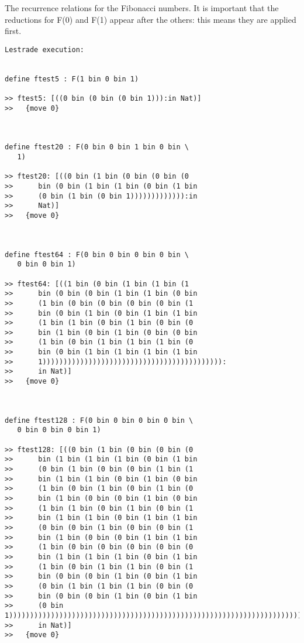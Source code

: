 \documentclass{article}
\begin{document}
The recurrence relations for the Fibonacci numbers.  It is important that the reductions for F(0) and F(1) appear after the others:  this means
they are applied first.

\begin{verbatim}Lestrade execution:


define ftest5 : F(1 bin 0 bin 1)

>> ftest5: [((0 bin (0 bin (0 bin 1))):in Nat)]
>>   {move 0}



define ftest20 : F(0 bin 0 bin 1 bin 0 bin \
   1)

>> ftest20: [((0 bin (1 bin (0 bin (0 bin (0
>>      bin (0 bin (1 bin (1 bin (0 bin (1 bin
>>      (0 bin (1 bin (0 bin 1))))))))))))):in
>>      Nat)]
>>   {move 0}



define ftest64 : F(0 bin 0 bin 0 bin 0 bin \
   0 bin 0 bin 1)

>> ftest64: [((1 bin (0 bin (1 bin (1 bin (1
>>      bin (0 bin (0 bin (1 bin (1 bin (0 bin
>>      (1 bin (0 bin (0 bin (0 bin (0 bin (1
>>      bin (0 bin (1 bin (0 bin (1 bin (1 bin
>>      (1 bin (1 bin (0 bin (1 bin (0 bin (0
>>      bin (1 bin (0 bin (1 bin (0 bin (0 bin
>>      (1 bin (0 bin (1 bin (1 bin (1 bin (0
>>      bin (0 bin (1 bin (1 bin (1 bin (1 bin
>>      1))))))))))))))))))))))))))))))))))))))))))):
>>      in Nat)]
>>   {move 0}



define ftest128 : F(0 bin 0 bin 0 bin 0 bin \
   0 bin 0 bin 0 bin 1)

>> ftest128: [((0 bin (1 bin (0 bin (0 bin (0
>>      bin (1 bin (1 bin (1 bin (0 bin (1 bin
>>      (0 bin (1 bin (0 bin (0 bin (1 bin (1
>>      bin (1 bin (1 bin (0 bin (1 bin (0 bin
>>      (1 bin (0 bin (1 bin (0 bin (1 bin (0
>>      bin (1 bin (0 bin (0 bin (1 bin (0 bin
>>      (1 bin (1 bin (0 bin (1 bin (0 bin (1
>>      bin (1 bin (1 bin (0 bin (1 bin (1 bin
>>      (0 bin (0 bin (1 bin (0 bin (0 bin (1
>>      bin (1 bin (0 bin (0 bin (1 bin (1 bin
>>      (1 bin (0 bin (0 bin (0 bin (0 bin (0
>>      bin (1 bin (1 bin (1 bin (0 bin (1 bin
>>      (1 bin (0 bin (1 bin (1 bin (0 bin (1
>>      bin (0 bin (0 bin (1 bin (0 bin (1 bin
>>      (0 bin (1 bin (1 bin (1 bin (0 bin (0
>>      bin (0 bin (0 bin (1 bin (0 bin (1 bin
>>      (0 bin 1)))))))))))))))))))))))))))))))))))))))))))))))))))))))))))))))))))))))))))))))))))))))):
>>      in Nat)]
>>   {move 0}


\end{verbatim}
\end{document}
